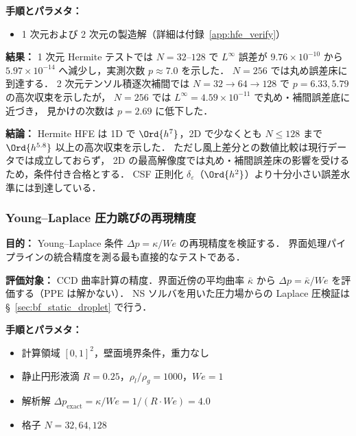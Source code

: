 \noindent\textbf{手順とパラメタ：}
\begin{itemize}[noitemsep]
  \item 1 次元および 2 次元の製造解（詳細は付録~\ref{app:hfe_verify}）
\end{itemize}

\noindent\textbf{結果：}
1 次元 Hermite テストでは $N=32$--$128$ で
$L^\infty$ 誤差が $9.76\times 10^{-10}$ から
$5.97\times 10^{-14}$ へ減少し，実測次数 $p \approx 7.0$ を示した．
$N=256$ では丸め誤差床に到達する．
2 次元テンソル積逐次補間では
$N=32\to64\to128$ で $p=6.33, 5.79$ の高次収束を示したが，
$N=256$ では $L^\infty = 4.59\times10^{-11}$ で丸め・補間誤差底に近づき，
見かけの次数は $p=2.69$ に低下した．

\noindent\textbf{結論：}
Hermite HFE は 1D で $\Ord{h^7}$，2D で少なくとも
$N\le128$ まで $\Ord{h^{5.8}}$ 以上の高次収束を示した．
ただし風上差分との数値比較は現行データでは成立しておらず，
2D の最高解像度では丸め・補間誤差床の影響を受けるため，条件付き合格とする．
CSF 正則化 $\delta_\varepsilon$（$\Ord{h^2}$）より十分小さい誤差水準には到達している．


\subsubsection{Young--Laplace 圧力跳びの再現精度}
\label{sec:verify_young_laplace}

\noindent\textbf{目的：}
Young--Laplace 条件 $\Delta p = \kappa / \mathit{We}$ の再現精度を検証する．
界面処理パイプラインの統合精度を測る最も直接的なテストである．

\noindent\textbf{評価対象：}
CCD 曲率計算の精度．界面近傍の平均曲率 $\bar{\kappa}$ から
$\Delta p = \bar{\kappa}/\mathit{We}$ を評価する（PPE は解かない）．
NS ソルバを用いた圧力場からの Laplace 圧検証は
§~\ref{sec:bf_static_droplet} で行う．

\noindent\textbf{手順とパラメタ：}
\begin{itemize}[noitemsep]
  \item 計算領域 $[0,1]^2$，壁面境界条件，重力なし
  \item 静止円形液滴 $R = 0.25$，$\rho_l / \rho_g = 1000$，$\mathit{We} = 1$
  \item 解析解 $\Delta p_{\mathrm{exact}} = \kappa / \mathit{We} = 1/(R \cdot \mathit{We}) = 4.0$
  \item 格子 $N = 32, 64, 128$
\end{itemize}

